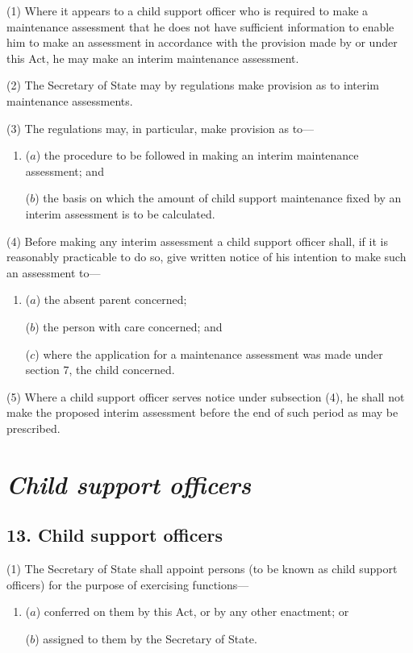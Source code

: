 \documentclass[12pt,a4paper]{article}
\begin{document}
(1) Where it appears to a child support officer who is required to make a maintenance assessment that he does not have sufficient information to enable him to make an assessment in accordance with the provision made by or under this Act, he may make an interim maintenance assessment.

(2) The Secretary of State may by regulations make provision as to interim maintenance assessments.

(3) The regulations may, in particular, make provision as to—
\begin{enumerate}\item[]
($a$) the procedure to be followed in making an interim maintenance assessment; and

($b$) the basis on which the amount of child support maintenance fixed by an interim assessment is to be calculated.
\end{enumerate}

(4) Before making any interim assessment a child support officer shall, if it is reasonably practicable to do so, give written notice of his intention to make such an assessment to—
\begin{enumerate}\item[]
($a$) the absent parent concerned;

($b$) the person with care concerned; and

($c$) where the application for a maintenance assessment was made under section 7, the child concerned.
\end{enumerate}

(5) Where a child support officer serves notice under subsection (4), he shall not make the proposed interim assessment before the end of such period as may be prescribed.


\section{\itshape Child support officers}

\subsection{13. Child support officers}

(1) The Secretary of State shall appoint persons (to be known as child support officers) for the purpose of exercising functions—
\begin{enumerate}\item[]
($a$) conferred on them by this Act, or by any other enactment; or

($b$) assigned to them by the Secretary of State.
\end{enumerate}
\end{document}
